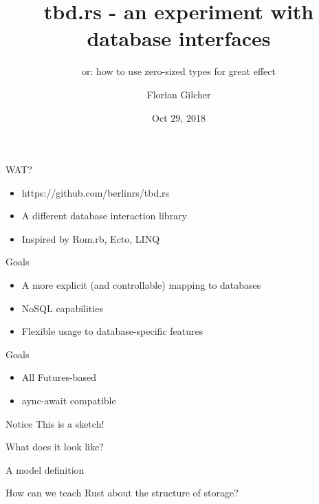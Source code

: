 \documentclass{beamer}
\title[tbd.rs - an experiment with database interfaces]
{tbd.rs - an experiment with database interfaces}
\subtitle[or: how to use zero-sized types for great effect]
{or: how to use zero-sized types for great effect}
\author 
{Florian Gilcher}
\institute
{
  CEO and Rust Trainer\\
  Ferrous Systems GmbH\\
  Chairperson of a Ruby non-profit}
\date
{Oct 29, 2018}
\begin{document}
\begin{frame}
  \titlepage
\end{frame}



\begin{frame}{WAT?}
  \begin{itemize}
    \item https://github.com/berlinrs/tbd.rs
    \item A different database interaction library
    \item Inspired by Rom.rb, Ecto, LINQ
  \end{itemize}
\end{frame}

\begin{frame}{Goals}
  \begin{itemize}
    \item A more explicit (and controllable) mapping to databases
    \item NoSQL capabilities
    \item Flexible usage to database-specific features
  \end{itemize}
\end{frame}

\begin{frame}{Goals}
  \begin{itemize}
    \item All Futures-based
    \item aync-await compatible
  \end{itemize}
\end{frame}

\begin{frame}{Notice}
  This is a sketch!
\end{frame}

\begin{frame}{What does it look like?}
\end{frame}

\begin{frame}{A model definition}
\end{frame}

\begin{frame}
  How can we teach Rust about the structure of storage?
\end{frame}
\end{document}
